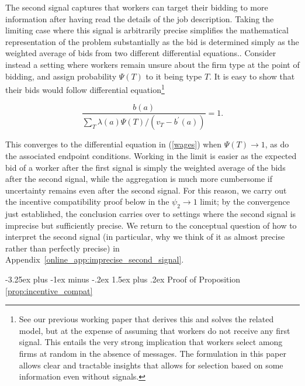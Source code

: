 \documentclass[12pt]{article}
\makeatletter
\renewcommand{\subsection}{%
  \@startsection{subsection}{2}{\z@}%
  {-3.25ex plus -1ex minus -.2ex}%
  {1.5ex plus .2ex}%
  {\normalfont\large\bfseries}%
}
\makeatother
\begin{document}
The second signal captures that workers can target their bidding to more information after having read the
details of the job description. Taking the limiting case where this signal
is arbitrarily precise simplifies the mathematical representation of the
problem substantially as the bid is determined simply as the weighted
average of bids from two different differential equations.. Consider instead
a setting where workers remain unsure about the firm type at the point of
bidding, and assign probability $\Psi (T)$ to it being type $T$. It is easy
to show that their bids would follow differential equation\footnote{
See our previous working paper \citep{horton2021sorting} that
derives this and solves the related model, but at the expense of assuming
that workers do not receive any first signal. This entails the very strong
implication that workers select among firms at random in the absence of
messages. The formulation in this paper allows clear and tractable insights
that allows for selection based on some information even without signals.}

\[
\frac{b(a)}{\sum\nolimits_{T}\lambda (a)\Psi (T)/(v_{T}-b^{\prime }(a))} =1.
\]

This converges to the differential equation in (\ref{wages}) when $\Psi(T)\longrightarrow 1$, as do the associated endpoint conditions. Working in the limit is easier as the expected bid of a worker after the first signal is simply the weighted average of the bids after the second signal, while the aggregation is much more cumbersome if uncertainty remains even after the second signal. For this reason, we carry out the incentive compatibility proof below in the $\psi_{2}\to 1$ limit; by the convergence just established, the conclusion carries over to settings where the second signal is imprecise but sufficiently precise. We return to the conceptual question of how to interpret the second signal (in particular, why we think of it as almost precise rather than perfectly precise) in Appendix~\ref{online_app:imprecise_second_signal}.

\subsection{Proof of Proposition \ref{prop:incentive_compat}}
\label{online_app:ic_proof}
\end{document}
